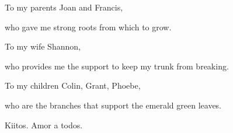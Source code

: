 
\thispagestyle{empty}

\begin{center}
To my parents Joan and Francis,

who gave me strong roots from which to grow.

To my wife Shannon,

who provides me the support to keep my trunk from breaking.

To my children Colin, Grant, Phoebe,

who are the branches that support the emerald green leaves.

Kiitos. Amor a todos.
\end{center}

\setlength{\abovedisplayskip}{-5pt}
\setlength{\abovedisplayshortskip}{-5pt}

\cleardoublepage\newpage